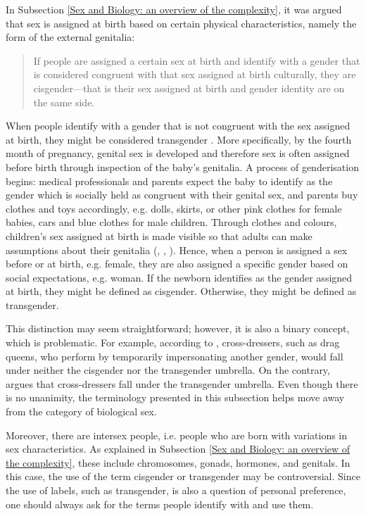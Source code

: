 In Subsection \ref{Sex and Biology: an overview of the complexity}, it was argued that sex is assigned at birth based on certain physical characteristics, namely the form of the external genitalia:
\begin{quote}
If people are assigned a certain sex at birth and identify with a gender that is considered congruent with that sex assigned at birth culturally, they are cisgender—that is their sex assigned at birth and gender identity are on the same side. \citep[59]{barker2019life}
\end{quote}
When people identify with a gender that is not congruent with the sex assigned at birth, they might be considered transgender \citep[60]{barker2019life}.
More specifically, by the fourth month of pregnancy, genital sex is developed and therefore sex is often assigned before birth through inspection of the baby's genitalia. A process of genderisation begins: medical professionals and parents expect the baby to identify as the gender which is socially held as congruent with their genital sex, and parents buy clothes and toys accordingly, e.g. dolls, skirts, or other pink clothes for female babies, cars and blue clothes for male children. Through clothes and colours, children's sex assigned at birth is made visible so that adults can make assumptions about their genitalia (\cite[7]{fausto2012sex}, \cite*[195]{fausto2016critiques}, \cite[107]{acanfora2021in}). Hence, when a person is assigned a sex before or at birth, e.g. female, they are also assigned a specific gender based on social expectations, e.g. woman. If the newborn identifies as the gender assigned at birth, they might be defined as cisgender. Otherwise, they might be defined as transgender. 

This distinction may seem straightforward; however, it is also a binary concept, which is problematic. For example, according to \textcite[72]{barker2019life}, cross-dressers, such as drag queens, who perform by temporarily impersonating another gender, would fall under neither the cisgender nor the transgender umbrella. On the contrary, \textcite{lester2018trans} argues that cross-dressers fall under the transgender umbrella. Even though there is no unanimity, the terminology presented in this subsection helps move away from the category of biological sex. 

Moreover, there are intersex people, i.e. people who are born with variations in sex characteristics. As explained in Subsection \ref{Sex and Biology: an overview of the complexity}, these include chromosomes, gonads, hormones, and genitals. In this case, the use of the term cisgender or transgender may be controversial. Since the use of labels, such as transgender, is also a question of personal preference, one should always ask for the terms people identify with and use them.

